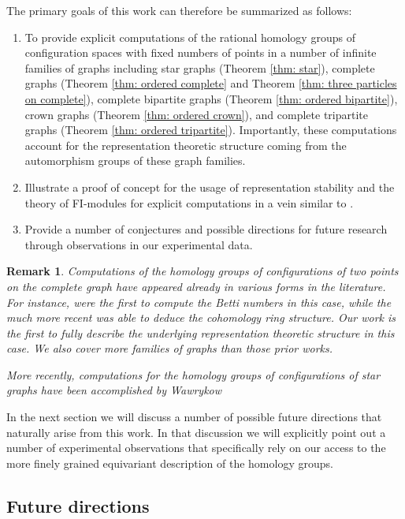 \documentclass[12pt]{amsart}
\newtheorem{remark}[thm]{Remark}
\theoremstyle{definition}
\begin{document}
The primary goals of this work can therefore be summarized as follows:

\begin{enumerate}
    \item To provide explicit computations of the rational homology groups of configuration spaces with fixed numbers of points in a number of infinite families of graphs including star graphs (Theorem \ref{thm: star}), complete graphs (Theorem \ref{thm: ordered complete} and Theorem \ref{thm: three particles on complete}), complete bipartite graphs (Theorem \ref{thm: ordered bipartite}), crown graphs (Theorem \ref{thm: ordered crown}), and complete tripartite graphs (Theorem \ref{thm: ordered tripartite}). Importantly, these computations account for the representation theoretic structure coming from the automorphism groups of these graph families.
    \item Illustrate a proof of concept for the usage of representation stability and the theory of FI-modules for explicit computations in a vein similar to \cite{MMPR}.
    \item Provide a number of conjectures and possible directions for future research through observations in our experimental data.
\end{enumerate}

\begin{remark}
    Computations of the homology groups of configurations of two points on the complete graph have appeared already in various forms in the literature. For instance, \cite{BF,FH} were the first to compute the Betti numbers in this case, while the much more recent \cite{GG} was able to deduce the cohomology ring structure. Our work is the first to fully describe the underlying representation theoretic structure in this case. We also cover more families of graphs than those prior works.

    More recently, computations for the homology groups of configurations of star graphs have been accomplished by Wawrykow \cite{wawrykow2025homology}
\end{remark}


In the next section we will discuss a number of possible future directions that naturally arise from this work. In that discussion we will explicitly point out a number of experimental observations that specifically rely on our access to the more finely grained equivariant description of the homology groups.

\subsection{Future directions}
\end{document}
